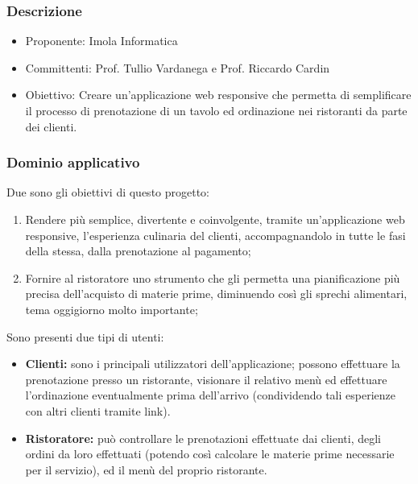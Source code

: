 \documentclass[a4paper, 11pt]{article}
\begin{document}
\subsubsection{Descrizione}
    \begin{itemize}
        \item Proponente: Imola Informatica
        \item Committenti: Prof. Tullio Vardanega e Prof. Riccardo Cardin
        \item Obiettivo: Creare un'applicazione web responsive che permetta di semplificare il processo di prenotazione di un tavolo ed ordinazione nei ristoranti da parte dei clienti.
    \end{itemize}

\subsubsection{Dominio applicativo} 
Due sono gli obiettivi di questo progetto:
\begin{enumerate}
    \item Rendere più semplice, divertente e coinvolgente, tramite un'applicazione web responsive, l’esperienza culinaria del clienti, accompagnandolo in tutte le fasi della stessa, dalla prenotazione al pagamento;
    \item  Fornire al ristoratore uno strumento che gli permetta una pianificazione più precisa dell'acquisto di materie prime, diminuendo così gli sprechi alimentari, tema oggigiorno molto importante;
\end{enumerate}
 
\vspace{20pt}
Sono presenti due tipi di utenti:
\begin{itemize}
    \item \textbf{Clienti:} sono i principali utilizzatori dell’applicazione; possono effettuare la prenotazione presso un ristorante, visionare il relativo menù ed effettuare l'ordinazione eventualmente prima dell'arrivo (condividendo tali esperienze con altri clienti tramite link).
    \item \textbf{Ristoratore:} può controllare le prenotazioni effettuate dai clienti, degli ordini da loro effettuati (potendo così calcolare le materie prime necessarie per il servizio), ed il menù del proprio ristorante.
\end{itemize}
\end{document}
